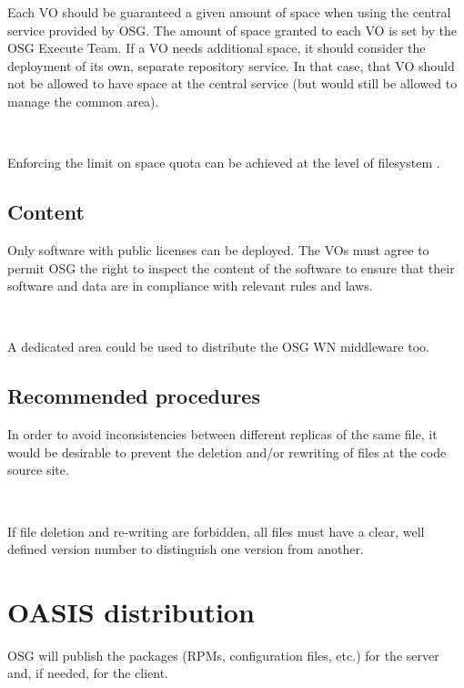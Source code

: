 \documentclass{article}
\begin{document}
Each VO should be guaranteed a given amount of space when using the central service provided by OSG. 
The amount of space granted to each VO is set by the OSG Execute Team.
If a VO needs additional space, it should consider the deployment of its own, separate repository service. 
In that case, that VO should not be allowed to have space at the central service 
(but would still be allowed to manage the common area).

~

Enforcing the limit on space quota can be achieved at the level of filesystem \cite{quota}. 

\subsection{Content}

Only software with public licenses can be deployed. The VOs must agree to
permit OSG the right to inspect the content of the software to ensure that
their software and data are in compliance with relevant rules and laws.

~

A dedicated area could be used to distribute the OSG WN middleware too.

\subsection{Recommended procedures}

In order to avoid inconsistencies between different replicas of the same file,
it would be desirable to prevent the deletion and/or rewriting of files at the 
code source site. 

~

If file deletion and re-writing are forbidden, all files must have a clear,
well defined version number to distinguish one version from another.


\section{OASIS distribution}

OSG will publish the packages (RPMs, configuration files, etc.) for the server and,
if needed, for the client. 

~

%
%
%
%
\end{document}
